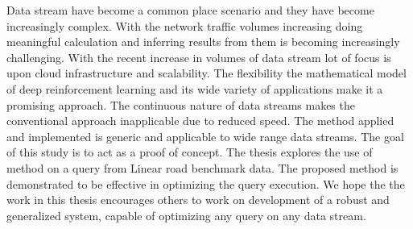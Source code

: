 Data stream have become a common place scenario and they have become increasingly complex. With the network traffic volumes increasing doing meaningful calculation and inferring results from them is becoming increasingly challenging. With the recent increase in volumes of data stream lot of focus is upon cloud infrastructure and scalability. The flexibility the mathematical model of deep reinforcement learning and its wide variety of applications make it a promising approach. The continuous nature of data streams makes the conventional approach inapplicable due to reduced speed. The method applied and implemented is generic and applicable to wide range data streams. The goal of this study is to act as a proof of concept. The thesis explores the use of method on a query from Linear road benchmark data. The proposed method is demonstrated to be effective in optimizing the query execution. We hope the the work in this thesis encourages others to work on development of a robust and generalized system, capable of optimizing any query on any data stream.

